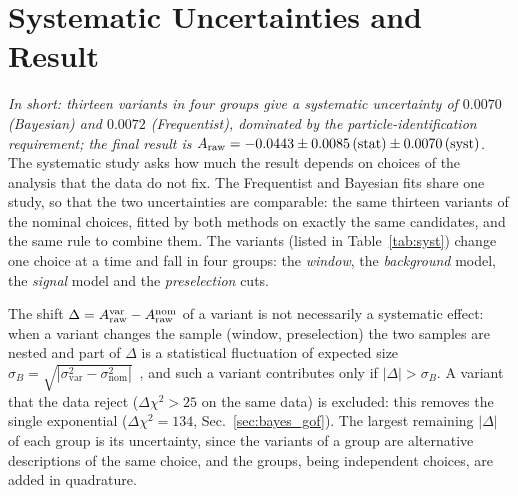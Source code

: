 \section{Systematic Uncertainties and Result}
\label{sec:syst}
\label{app:syst}
\emph{In short: thirteen variants in four groups give a systematic uncertainty of $0.0070$ (Bayesian) and $0.0072$ (Frequentist), dominated by the particle-identification requirement; the final result is $A_{\mathrm{raw}}=-0.0443\pm0.0085\,(\text{stat})\pm0.0070\,(\text{syst})$.}
The systematic study asks how much the result depends on choices of the analysis that the data do not fix. The Frequentist and Bayesian fits share one study, so that the two uncertainties are comparable: the same thirteen variants of the nominal choices, fitted by both methods on exactly the same candidates, and the same rule to combine them. The variants (listed in Table~\ref{tab:syst}) change one choice at a time and fall in four groups: the \emph{window}, the \emph{background} model, the \emph{signal} model and the \emph{preselection} cuts.

The shift $\Delta=A_{\mathrm{raw}}^{\mathrm{var}}-A_{\mathrm{raw}}^{\mathrm{nom}}$ of a variant is not necessarily a systematic effect: when a variant changes the sample (window, preselection) the two samples are nested and part of $\Delta$ is a statistical fluctuation of expected size $\sigma_B=\sqrt{|\sigma_{\mathrm{var}}^2-\sigma_{\mathrm{nom}}^2|}$~\cite{barlow}, and such a variant contributes only if $|\Delta|>\sigma_B$. A variant that the data reject ($\Delta\chi^2>25$ on the same data) is excluded: this removes the single exponential ($\Delta\chi^2=134$, Sec.~\ref{sec:bayes_gof}). The largest remaining $|\Delta|$ of each group is its uncertainty, since the variants of a group are alternative descriptions of the same choice, and the groups, being independent choices, are added in quadrature.

